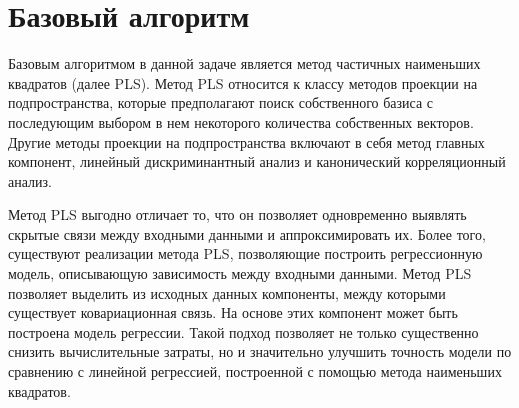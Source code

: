 \section{Базовый алгоритм}
Базовым алгоритмом в данной задаче является метод частичных наименьших квадратов (далее PLS).
Метод PLS относится к классу методов проекции на подпространства, которые предполагают поиск собственного базиса с последующим выбором в нем некоторого количества собственных векторов. Другие методы проекции на подпространства включают в себя метод главных компонент, линейный дискриминантный анализ и канонический корреляционный анализ. 

Метод PLS выгодно отличает то, что он позволяет одновременно выявлять скрытые связи между входными данными и аппроксимировать их. Более того, существуют реализации метода PLS, позволяющие построить регрессионную модель, описывающую зависимость между входными данными. 
Метод  PLS позволяет выделить из исходных данных компоненты, между которыми существует ковариационная связь. На основе этих компонент может быть построена модель регрессии. Такой подход позволяет не только существенно снизить вычислительные затраты, но и значительно улучшить точность модели по сравнению с линейной регрессией, построенной с помощью метода наименьших квадратов. 


